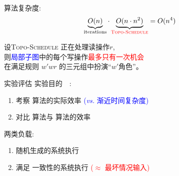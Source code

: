 \begin{frame}{}
  \readcentric{} 算法复杂度: 
  \[
    \underbrace{O(n)}_{\textrm{iterations}} \cdot
	\underbrace{O(n \cdot n^2)}_{\textcolor{red}{\textsc{Topo-Schedule}}} = O(n^4)
  \]

  \vspace{0.30cm}
  \begin{clemma}
    \begin{center}
      设\textsc{Topo-Schedule} 正在处理读操作$r$,\\
      则\textcolor{blue}{局部子图}中的每个写操作\textcolor{red}{最多只有一次机会}\\
      在满足规则 $w'wr$ 的三元组中扮演``$w'$角色''。
    \end{center}
  \end{clemma}
\end{frame}

\begin{frame}{实验评估}
  实验目的~\footnotemark[1]~:
  \begin{enumerate}
    \item 考察 \readcentric{} 算法的实际效率 
      \textcolor{blue}{\small ({\it vs.} 渐近时间复杂度)}
    \item 对比 \readcentric{} 算法与 \rwclosure{} 算法的效率
  \end{enumerate}

  \pause
  \vspace{0.50cm}

  两类负载:
  \begin{enumerate}
    \item 随机生成的系统执行
    \item 满足 \PRAM{} 一致性的系统执行 \textcolor{red}{\small ($\approx$ 最坏情况输入)}
  \end{enumerate}
\end{frame}

